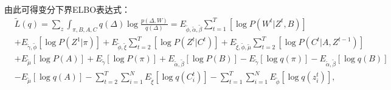 


由此可得变分下界ELBO表达式：
\begin{equation}
\label{eq:3}
\begin{split}
&\widetilde{L}(q) = \sum_z \int_{\pi,B,A,C} q(\Delta) \log \frac{p(\Delta,W)}{q(\Delta)} 
= E_{\widetilde{\phi},\widetilde{\alpha},\widetilde{\beta}} \sum_{t=1}^T [\log P(W^t|Z^t,B)] \\
&+ E_{\widetilde{\gamma},\widetilde{\phi}}[\log P(Z^1|\pi)] + E_{\widetilde{\phi},\widetilde{\xi}} \sum_{t=2}^T [\log P(Z^t|C^t)] 
+ E_{\widetilde{\xi},\widetilde{\phi},\widetilde{\mu}} \sum_{t=2}^T [\log P(C^t|A,Z^{t-1})] \\
&+ E_{\widetilde{\mu}}[\log P(A)] + E_{\widetilde{\gamma}}[\log P(\pi)] + E_{\widetilde{\alpha},\widetilde{\beta}}[\log P(B)] 
- E_{\widetilde{\gamma}}[\log q(\pi)] - E_{\widetilde{\alpha},\widetilde{\beta}}[\log q(B)] \\
&- E_{\widetilde{\mu}}[\log q(A)] - \sum_{t=2}^T \sum_{i=1}^N E_{\widetilde{\xi}}[\log q(C_i^t)] - \sum_{t=1}^T \sum_{i=1}^N E_{\widetilde{\phi}}[\log q(z_i^t)] ,\\
\end{split}
\end{equation}

